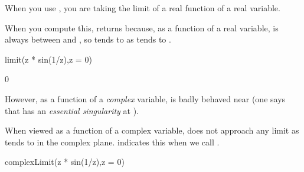 {{{{{{{{{{{{When you use , you are taking the limit of a real
function of a real variable.
\begin{xtc}
\begin{xtccomment}
When you compute this,
\Language{} returns  because, as a function of a real variable,
 is always between  and , so 
tends to  as  tends to .
\end{xtccomment}
\begin{spadsrc}
limit(z * sin(1/z),z = 0)
\end{spadsrc}
\begin{TeXOutput}
\begin{fricasmath}{9}
0%
\end{fricasmath}
\end{TeXOutput}
\end{xtc}
However, as a function of a {\it complex} variable,  is badly
behaved near  (one says that  has an
{\it essential singularity} at ).
\begin{xtc}
\begin{xtccomment}
When viewed as a function of a complex variable, 
does not approach any limit as  tends to  in the complex plane.
\Language{} indicates this when we call .
\end{xtccomment}
\begin{spadsrc}
complexLimit(z * sin(1/z),z = 0)
\end{spadsrc}
\begin{TeXOutput}
\begin{fricasmath}{10}
%
\end{fricasmath}
\end{TeXOutput}
\end{xtc}


}}}}}}}}}}}}
